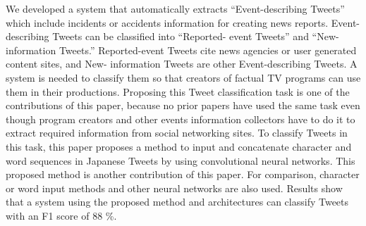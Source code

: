 We developed a system that automatically extracts ``Event-describing Tweets'' which include incidents or accidents information for creating news reports. Event-describing Tweets can be classified into ``Reported- event Tweets'' and ``New-information Tweets.'' Reported-event Tweets cite news agencies or user generated content sites, and New- information Tweets are other Event-describing Tweets. A system is needed to classify them so that creators of factual TV programs can use them in their productions. Proposing this Tweet classification task is one of the contributions of this paper, because no prior papers have used the same task even though program creators and other events information collectors have to do it to extract required information from social networking sites. To classify Tweets in this task, this paper proposes a method to input and concatenate character and word sequences in Japanese Tweets by using convolutional neural networks. This proposed method is another contribution of this paper. For comparison, character or word input methods and other neural networks are also used. Results show that a system using the proposed method and architectures can classify Tweets with an F1 score of 88 \%.
